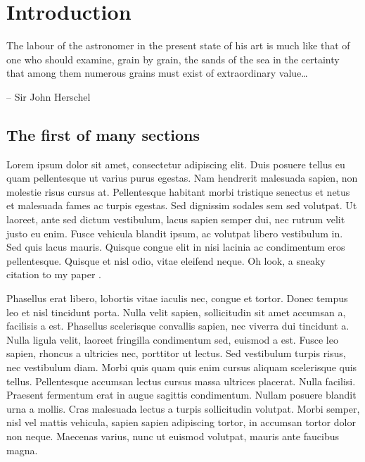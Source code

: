 \chapter{Introduction}\label{introduction}

\epigraph{The labour of the astronomer in the present state of his art is much like that of one who should examine, grain by grain, the sands of the sea in the certainty that among them numerous grains must exist of extraordinary value\dots}{-- Sir John Herschel\footnotemark}



\section{The first of many sections}

Lorem ipsum dolor sit amet, consectetur adipiscing elit. Duis posuere tellus eu quam pellentesque ut varius purus egestas. Nam hendrerit malesuada sapien, non molestie risus cursus at. Pellentesque habitant morbi tristique senectus et netus et malesuada fames ac turpis egestas. Sed dignissim sodales sem sed volutpat. Ut laoreet, ante sed dictum vestibulum, lacus sapien semper dui, nec rutrum velit justo eu enim. Fusce vehicula blandit ipsum, ac volutpat libero vestibulum in. Sed quis lacus mauris. Quisque congue elit in nisi lacinia ac condimentum eros pellentesque. Quisque et nisl odio, vitae eleifend neque. Oh look, a sneaky citation to my paper \citep[][of which I am a co-author]{Kastner12}.


Phasellus erat libero, lobortis vitae iaculis nec, congue et tortor. Donec tempus leo et nisl tincidunt porta. Nulla velit sapien, sollicitudin sit amet accumsan a, facilisis a est. Phasellus scelerisque convallis sapien, nec viverra dui tincidunt a. Nulla ligula velit, laoreet fringilla condimentum sed, euismod a est. Fusce leo sapien, rhoncus a ultricies nec, porttitor ut lectus. Sed vestibulum turpis risus, nec vestibulum diam. Morbi quis quam quis enim cursus aliquam scelerisque quis tellus. Pellentesque accumsan lectus cursus massa ultrices placerat. Nulla facilisi. Praesent fermentum erat in augue sagittis condimentum. Nullam posuere blandit urna a mollis. Cras malesuada lectus a turpis sollicitudin volutpat. Morbi semper, nisl vel mattis vehicula, sapien sapien adipiscing tortor, in accumsan tortor dolor non neque. Maecenas varius, nunc ut euismod volutpat, mauris ante faucibus magna.

